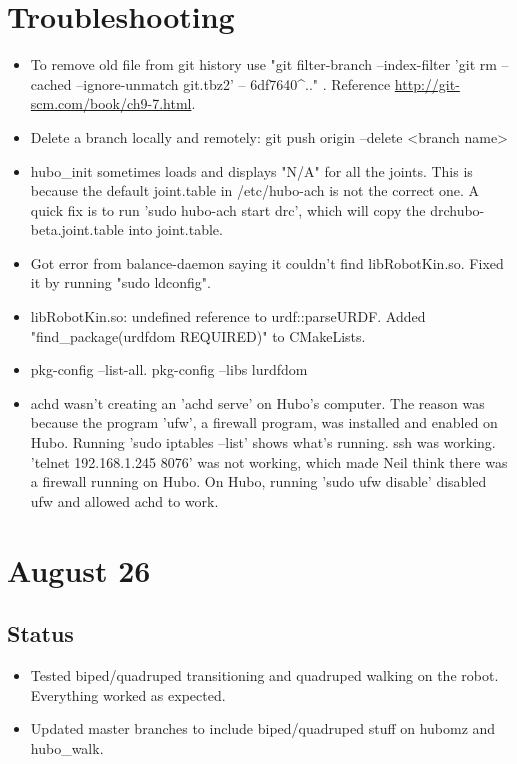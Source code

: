 \documentclass[letterpaper, 10 pt]{report}
\begin{document}
\section*{Troubleshooting}
\begin{itemize}
\item To remove old file from git history use "git filter-branch --index-filter 'git rm --cached --ignore-unmatch git.tbz2' -- 6df7640\string^.." . Reference \url{http://git-scm.com/book/ch9-7.html}.
\item Delete a branch locally and remotely: git push origin --delete <branch name>
\item hubo\_init sometimes loads and displays "N/A" for all the joints. This is because the default joint.table in /etc/hubo-ach is not the correct one. A quick fix is to run 'sudo hubo-ach start drc', which will copy the drchubo-beta.joint.table into joint.table.
\item Got error from balance-daemon saying it couldn't find libRobotKin.so. Fixed it by running "sudo ldconfig".
\item libRobotKin.so: undefined reference to urdf::parseURDF. Added "find\_package(urdfdom REQUIRED)" to CMakeLists.
\item pkg-config --list-all. pkg-config --libs lurdfdom
\item achd wasn't creating an 'achd serve' on Hubo's computer. The reason was because the program 'ufw', a firewall program, was installed and enabled on Hubo. Running 'sudo iptables --list' shows what's running. ssh was working. 'telnet 192.168.1.245 8076' was not working, which made Neil think there was a firewall running on Hubo. On Hubo, running 'sudo ufw disable' disabled ufw and allowed achd to work.
\end{itemize}

\section*{August 26}
\subsection*{Status}
\begin{itemize}
\item Tested biped/quadruped transitioning and quadruped walking on the robot. Everything worked as expected.
\item Updated master branches to include biped/quadruped stuff on hubomz and hubo\_walk.
\end{itemize}
\end{document}

